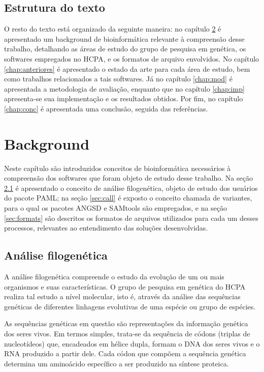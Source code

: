 \documentclass[cic,tc]{iiufrgs}
\begin{document}
%
%
\section{Estrutura do texto}

O resto do texto está organizado da seguinte maneira: no capítulo
\ref{chap:background} é apresentado um background de bioinformática relevante à
compreensão desse trabalho, detalhando as áreas de estudo do grupo de pesquisa
em genética, os softwares empregados no HCPA, e os formatos de arquivo
envolvidos. No capítulo \ref{chap:anteriores} é apresentado o estado da arte
para cada área de estudo, bem como trabalhos relacionados a tais softwares. Já
no capítulo \ref{chap:mod} é apresentada a metodologia de avaliação, enquanto
que no capítulo \ref{chap:imp} apresenta-se sua implementação e os resultados
obtidos.  Por fim, no capítulo \ref{chap:conc} é apresentada uma conclusão,
seguida das referências.

%
%
%
%

\chapter{Background}
\label{chap:background}

Neste capítulo são introduzidos conceitos de bioinformática necessários à
compreensão dos softwares que foram objeto de estudo desse trabalho.
Na seção \ref{sec:filo} é apresentado o conceito de análise filogenética,
objeto de estudo dos usuários do pacote PAML; na seção \ref{sec:call} é exposto
o conceito chamada de variantes, para o qual os pacotes ANGSD e SAMtools
são empregados, e na seção \ref{sec:formats} são descritos os formatos de
arquivos utilizados para cada um desses processos, relevantes ao entendimento
das soluções desenvolvidas.

\section{Análise filogenética}
\label{sec:filo}

A análise filogenética compreende o estudo da evolução de um ou mais organismos
e suas características. O grupo de pesquisa em genética do HCPA realiza tal
estudo a nível molecular, isto é, através da análise das sequências genéticas
de diferentes linhagens evolutivas de uma espécie ou grupo de espécies.

As sequências genéticas em questão são representações da informação genética
dos seres vivos. Em termos simples, trata-se da sequência de códons (triplas de
nucleotídeos) que, encadeados em hélice dupla, formam o DNA dos seres vivos e o
RNA produzido a partir dele. Cada códon que compõem a sequência genética
determina um aminoácido específico a ser produzido na síntese proteica.
\end{document}
